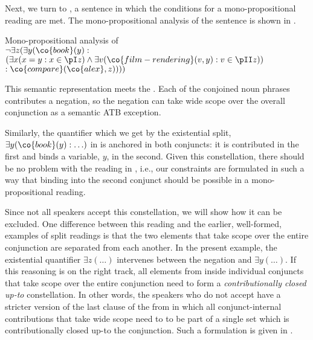 \documentclass[output=paper]{langsci/langscibook}
\begin{document}
Next, we turn to , a sentence in which the conditions for a mono-pro\-po\-si\-tional reading are met.
The mono-propositional analysis of the sentence is shown in . 

\ea Mono-propositional analysis of \label{mono-no-ana}\\[1ex]
$\lnot \exists z (\exists y (\co{book}(y) : $\\
\hspace*{3em}$(\exists x (x = y : x \in \pI z) 
\land \exists v (\co{film-rendering}(v,y) : v \in \pII z)
) $\\
\hspace*{\fill}$: \co{compare}(\co{alex},z)))
)$
\z

\begin{sloppypar}
  This semantic representation meets the \CCB{}.  Each of the
  conjoined noun phrases contributes a negation, so the negation can
  take wide scope over the overall conjunction as a semantic ATB
  exception.
\end{sloppypar}

Similarly, the quantifier which we get by the existential split, $\exists y (\co{book}(y) : \ldots)$ in  is anchored in both conjuncts: it is contributed in the first and binds a variable, $y$, in the second.
Given this constellation, there should be no problem with the reading in , i.e., our constraints are formulated in such a way that binding into the second conjunct should be possible in a mono-propositional reading.

Since not all speakers accept this constellation, we will show how it can be excluded.
One difference between this reading and the earlier, well-formed, examples of split readings is that the two elements that take scope over the entire conjunction are separated from each another. 
In the present example, the existential quantifier $\exists z (\ldots)$ intervenes between the negation and $\exists y (\ldots)$.
If this reasoning is on the right track, all elements from inside individual conjuncts that take scope over the entire conjunction need to form a \emph{contributionally closed up-to} constellation. 
In other words, the speakers who do not accept  have a stricter version of the last clause of the \CCB{} from  in which all conjunct-internal contributions that take wide scope need to 
to be part of a single set which is contributionally closed up-to the conjunction.
Such a formulation is given in .\largerpage[-2]
\end{document}
